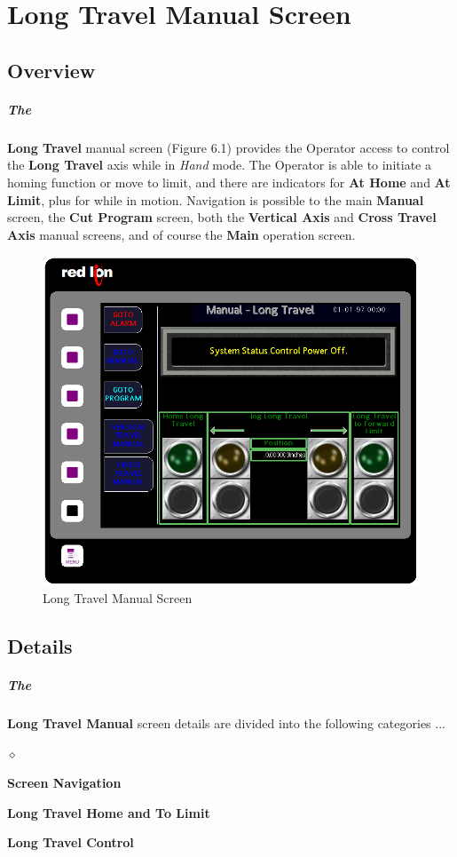 \chapter{Long Travel Manual Screen}
\section{Overview}\paragraph*{The}\textbf{Long Travel} manual screen (Figure 6.1) provides the Operator access to control the \textbf{Long Travel} axis while in \textit{Hand} mode. The Operator is able to initiate a homing function or move to limit, and there are indicators for \textbf{At Home} and \textbf{At Limit}, plus for while in motion. Navigation is possible to the main \textbf{Manual} screen, the \textbf{Cut Program} screen, both the \textbf{Vertical Axis} and \textbf{Cross Travel Axis} manual screens, and of course the \textbf{Main} operation screen.
\begin{figure}
	\centering
	\includegraphics[width=0.5\linewidth]{screen-captures/manual/long-manual}
	\caption{Long Travel Manual Screen}
	\label{fig:manual-long-screen}
\end{figure}
\section{Details}\paragraph*{The}\textbf{Long Travel Manual} screen details are divided into the following categories ...
\begin{list}{$\diamond$}{}
	\item \textbf{Screen Navigation}
	\item \textbf{Long Travel Home and To Limit}
	\item \textbf{Long Travel Control}
\end{list}
\pagebreak
